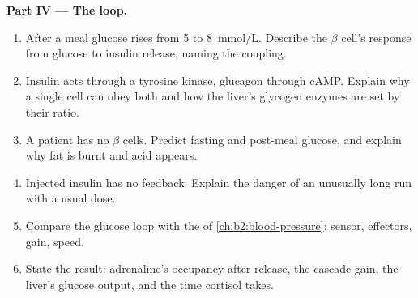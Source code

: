 \begin{problem}
\medskip
\noindent\textbf{Part IV --- The loop.}
\begin{enumerate}[resume]
  \item After a meal glucose rises from 5 to \qty{8}{mmol/L}.
        Describe the $\beta$ cell's response from glucose to
        insulin release, naming the coupling.
  \item Insulin acts through a tyrosine kinase, glucagon through
        cAMP. Explain why a single cell can obey both and how the
        liver's glycogen enzymes are set by their ratio.
  \item A patient has no $\beta$ cells. Predict fasting and
        post-meal glucose, and explain why fat is burnt and acid
        appears.
  \item Injected insulin has no feedback. Explain the danger of an
        unusually long run with a usual dose.
  \item Compare the glucose loop with the  of
        \cref{ch:b2:blood-pressure}: sensor, effectors, gain, speed.
  \item State the result: adrenaline's occupancy after release, the
        cascade gain, the liver's glucose output, and the time
        cortisol takes.
\end{enumerate}
\end{problem}
